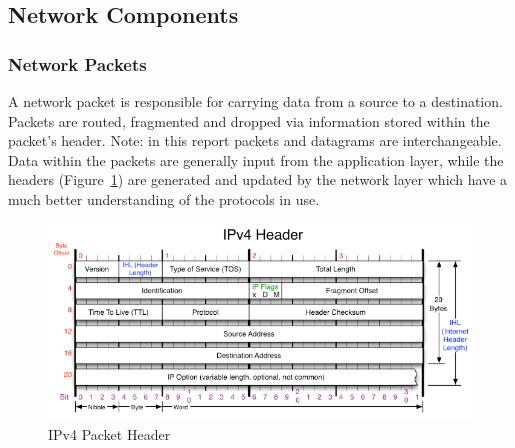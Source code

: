 \documentclass[a4paper, titlepage]{article}
\begin{document}
\subsection{Network Components}
\subsubsection{Network Packets}
A network packet is responsible for carrying data from a source to a destination. Packets are routed, fragmented and dropped via information stored within the packet's header. Note: in this report packets and datagrams are interchangeable. Data within the packets are generally input from the application layer, while the headers (Figure~\ref{fig:ipv4}) are generated and updated by the network layer which have a much better understanding of the protocols in use.

\begin{figure}[H]
	\centering
	\includegraphics[width=\textwidth]{images/ipv4header.png}
	\caption{IPv4 Packet Header}
	\label{fig:ipv4}
\end{figure}
\end{document}
